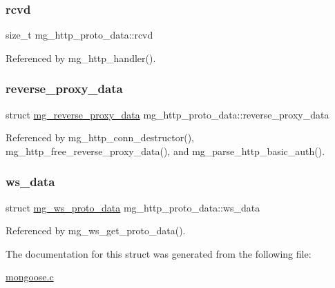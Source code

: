 \mbox{\label{structmg__http__proto__data_a2c8c53d0cf1a36075bad3a4c4a3bb915_a2c8c53d0cf1a36075bad3a4c4a3bb915}} 
\subsubsection{\texorpdfstring{rcvd}{rcvd}}
{\footnotesize\ttfamily size\+\_\+t mg\+\_\+http\+\_\+proto\+\_\+data\+::rcvd}



Referenced by mg\+\_\+http\+\_\+handler().

\mbox{\label{structmg__http__proto__data_a5aab556501a2b7d27a44a87d51c86f8b_a5aab556501a2b7d27a44a87d51c86f8b}} 
\subsubsection{\texorpdfstring{reverse\+\_\+proxy\+\_\+data}{reverse\_proxy\_data}}
{\footnotesize\ttfamily struct \hyperlink{structmg__reverse__proxy__data}{mg\+\_\+reverse\+\_\+proxy\+\_\+data} mg\+\_\+http\+\_\+proto\+\_\+data\+::reverse\+\_\+proxy\+\_\+data}



Referenced by mg\+\_\+http\+\_\+conn\+\_\+destructor(), mg\+\_\+http\+\_\+free\+\_\+reverse\+\_\+proxy\+\_\+data(), and mg\+\_\+parse\+\_\+http\+\_\+basic\+\_\+auth().

\mbox{\label{structmg__http__proto__data_a25d8b118af48eb310e9e86e91ede75eb_a25d8b118af48eb310e9e86e91ede75eb}} 
\subsubsection{\texorpdfstring{ws\+\_\+data}{ws\_data}}
{\footnotesize\ttfamily struct \hyperlink{structmg__ws__proto__data}{mg\+\_\+ws\+\_\+proto\+\_\+data} mg\+\_\+http\+\_\+proto\+\_\+data\+::ws\+\_\+data}



Referenced by mg\+\_\+ws\+\_\+get\+\_\+proto\+\_\+data().



The documentation for this struct was generated from the following file\+:\begin{DoxyCompactItemize}
\item 
\hyperlink{mongoose_8c}{mongoose.\+c}\end{DoxyCompactItemize}
